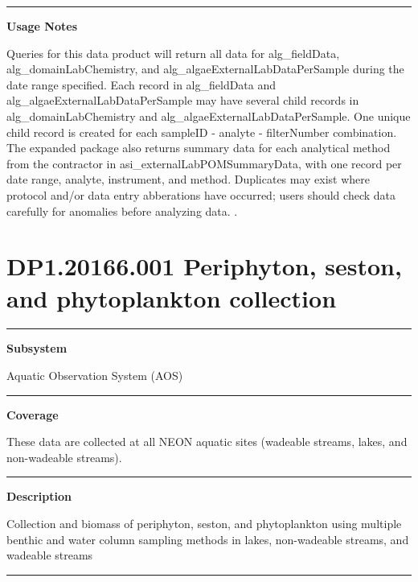 \documentclass[]{article}
\begin{document}
\begin{center}\rule{0.5\linewidth}{\linethickness}\end{center}

\textbf{Usage Notes}

Queries for this data product will return all data for alg\_fieldData,
alg\_domainLabChemistry, and alg\_algaeExternalLabDataPerSample during
the date range specified. Each record in alg\_fieldData and
alg\_algaeExternalLabDataPerSample may have several child records in
alg\_domainLabChemistry and alg\_algaeExternalLabDataPerSample. One
unique child record is created for each sampleID - analyte -
filterNumber combination. The expanded package also returns summary data
for each analytical method from the contractor in
asi\_externalLabPOMSummaryData, with one record per date range, analyte,
instrument, and method. Duplicates may exist where protocol and/or data
entry abberations have occurred; users should check data carefully for
anomalies before analyzing data. \newpage
.

\section{DP1.20166.001 Periphyton, seston, and phytoplankton
collection}\label{dp1.20166.001-periphyton-seston-and-phytoplankton-collection}

\begin{center}\rule{0.5\linewidth}{\linethickness}\end{center}

\textbf{Subsystem}

Aquatic Observation System (AOS)

\begin{center}\rule{0.5\linewidth}{\linethickness}\end{center}

\textbf{Coverage}

These data are collected at all NEON aquatic sites (wadeable streams,
lakes, and non-wadeable streams).

\begin{center}\rule{0.5\linewidth}{\linethickness}\end{center}

\textbf{Description}

Collection and biomass of periphyton, seston, and phytoplankton using
multiple benthic and water column sampling methods in lakes,
non-wadeable streams, and wadeable streams

\begin{center}\rule{0.5\linewidth}{\linethickness}\end{center}
\end{document}

